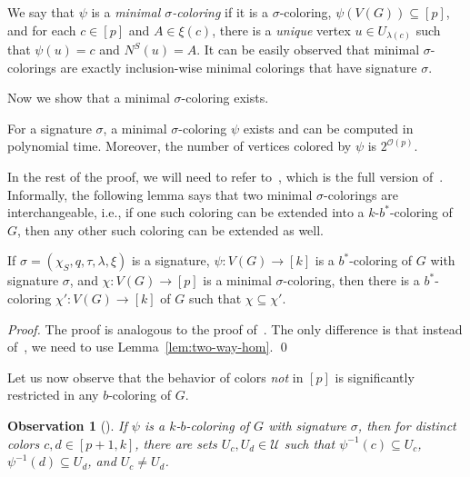 \documentclass[runningheads, envcountsame]{llncs}
\newcommand{\seq}{\subseteq}
\newcommand{\ca}{\mathcal}
\newtheorem{observation}[theorem]{Observation}
\begin{document}
We say that $\psi$ is a \emph{minimal $\sigma$-coloring} if it is a $\sigma$-coloring, $\psi(V(G)) \seq [p]$, and for each $c \in [p]$ and $A \in \xi(c)$, there is a \emph{unique} vertex $u \in U_{\lambda(c)}$ such that $\psi(u) = c$ and $N^S(u) = A$.
It can be easily observed that minimal $\sigma$-colorings are exactly inclusion-wise minimal colorings that have signature $\sigma$.

Now we show that a minimal $\sigma$-coloring exists.

\begin{lemma}\label{lem:minimal-sigma-exists}
For a signature $\sigma$, a minimal $\sigma$-coloring $\psi$ exists and can be computed in polynomial time. Moreover, the number of vertices colored by $\psi$ is $2^{\ca O(p)}$.
\end{lemma}

In the rest of the proof, we will need to refer to~\cite{balaban2025finding}, which is the full version of~\cite{DBLP:conf/mfcs/Balaban26}.
Informally, the following lemma says that two minimal $\sigma$-colorings are interchangeable, i.e., if one such coloring can be extended into a $k$-$b^*$-coloring of $G$, then any other such coloring can be extended as well.

\begin{lemma}\label{lem:any-minimal-coloring-can-be-used}
If $\sigma = (\chi_S, q, \tau, \lambda, \xi)$ is a signature, $\psi\colon V(G) \rightarrow [k]$ is a $b^*$-coloring of $G$ with signature $\sigma$, and $\chi \colon V(G) \rightarrow [p]$ is a minimal $\sigma$-coloring, then there is a $b^*$-coloring $\chi' \colon V(G) \rightarrow [k]$ of $G$ such that $\chi \seq \chi'$.
\end{lemma}
\begin{proof}
The proof is analogous to the proof of~\cite[Lemma 16]{balaban2025finding}.
The only difference is that instead of~\cite[Lemma 3]{balaban2025finding}, we need to use Lemma~\ref{lem:two-way-hom}.
\qed\end{proof}

Let us now observe that the behavior of colors \emph{not} in $[p]$ is significantly restricted in any $b$-coloring of $G$.

\begin{observation}[{\cite[Observation 15]{balaban2025finding}}]\label{obs:anonym}
If $\psi$ is a $k$-$b$-coloring of $G$ with signature $\sigma$, then for distinct colors $c, d \in [p+1, k]$, there are sets $U_c, U_d \in \ca U$ such that $\psi^{-1}(c) \seq U_c$, $\psi^{-1}(d) \seq U_d$, and $U_c \ne U_d$.
\end{observation}
\end{document}
